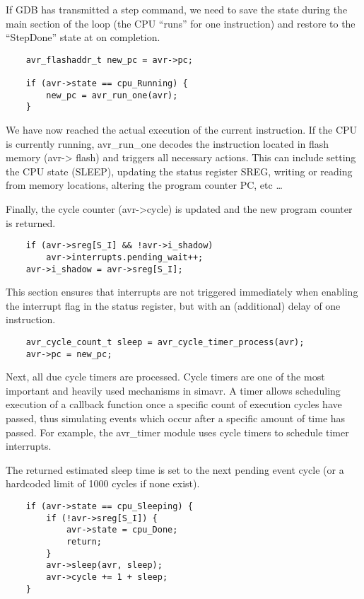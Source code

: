 If GDB has transmitted a step command, we need to save the state during the
main section of the loop (the CPU ``runs'' for one instruction) and restore to
the ``StepDone'' state at on completion.

\begin{lstlisting}
    avr_flashaddr_t new_pc = avr->pc;

    if (avr->state == cpu_Running) {
        new_pc = avr_run_one(avr);
    }
\end{lstlisting}

We have now reached the actual execution of the current instruction. If the CPU
is currently running, avr\_run\_one decodes the instruction located in flash memory (avr-\textgreater
flash) and triggers all necessary actions. This can include setting the CPU
state (SLEEP), updating the status register SREG, writing or reading from memory
locations, altering the program counter PC, etc \ldots

Finally, the cycle counter (avr-\textgreater cycle) is updated and the new
program counter is returned.

\begin{lstlisting}
    if (avr->sreg[S_I] && !avr->i_shadow)
        avr->interrupts.pending_wait++;
    avr->i_shadow = avr->sreg[S_I];
\end{lstlisting}

This section ensures that interrupts are not triggered immediately when
enabling the interrupt flag in the status register, but with an (additional)
delay of one instruction.

\begin{lstlisting}
    avr_cycle_count_t sleep = avr_cycle_timer_process(avr);
    avr->pc = new_pc;
\end{lstlisting}

Next, all due cycle timers are processed. Cycle timers are one of the
most important and heavily used mechanisms in simavr. A timer allows scheduling
execution of a callback function once a specific count of execution cycles have
passed, thus simulating events which occur after a specific amount of time has
passed. For example, the avr\_timer module uses cycle timers to schedule timer
interrupts.

The returned estimated sleep time is set to the next pending event cycle (or a
hardcoded limit of 1000 cycles if none exist).

\begin{lstlisting}
    if (avr->state == cpu_Sleeping) {
        if (!avr->sreg[S_I]) {
            avr->state = cpu_Done;
            return;
        }
        avr->sleep(avr, sleep);
        avr->cycle += 1 + sleep;
    }
\end{lstlisting}


